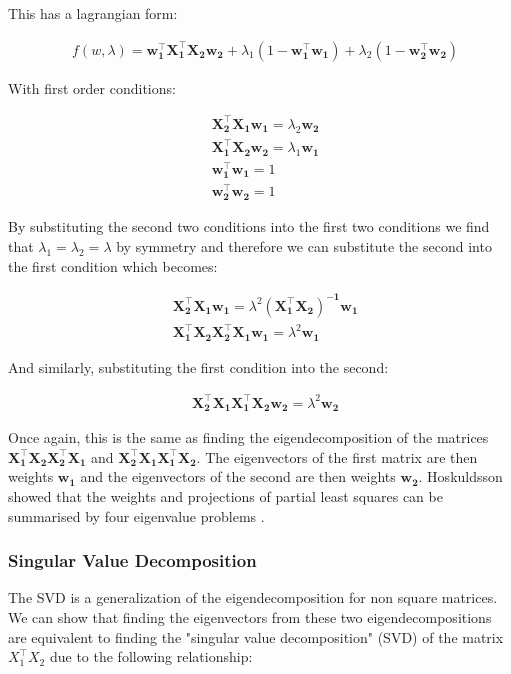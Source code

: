 This has a lagrangian form:

\begin{align}
     & f(w,\lambda)=\mathbf{w_1^{\top}X_1^{\top}X_2w_2} + \lambda_1(1-\mathbf{w_1^{\top}w_1}) + \lambda_2(1-\mathbf{w_2^{\top}w_2})
\end{align}

With first order conditions:

\begin{align}
     & \mathbf{X_2^{\top}X_1w_1}=\lambda_2\mathbf{w_2} \\
     & \mathbf{X_1^{\top}X_2w_2}=\lambda_1\mathbf{w_1} \\
     & \mathbf{w_1^{\top}w_1}=1                        \\
     & \mathbf{w_2^{\top}w_2}=1
\end{align}

By substituting the second two conditions into the first two conditions we find that $\lambda_1=\lambda_2=\lambda$ by symmetry and therefore we can substitute the second into the first condition which becomes:

\begin{align}
     & \mathbf{X_2^{\top}X_1w_1}=\lambda^2\mathbf{(X_1^{\top}X_2)^{-1}w_1} \\
     & \mathbf{X_1^{\top}X_2X_2^{\top}X_1w_1}=\lambda^2\mathbf{w_1}
\end{align}

And similarly, substituting the first condition into the second:

\begin{align}
     & \mathbf{X_2^{\top}X_1X_1^{\top}X_2w_2}=\lambda^2\mathbf{w_2}
\end{align}

Once again, this is the same as finding the eigendecomposition of the matrices $\mathbf{X_1^{\top}X_2X_2^{\top}X_1}$ and $\mathbf{X_2^{\top}X_1X_1^{\top}X_2}$. The eigenvectors of the first matrix are then weights $\mathbf{w_1}$ and the eigenvectors of the second are then weights $\mathbf{w_2}$. Hoskuldsson showed that the weights and projections of partial least squares can be summarised by four eigenvalue problems \cite{hoskuldsson1988pls}.

\subsubsection{Singular Value Decomposition}

The SVD is a generalization of the eigendecomposition for non square matrices. We can show that finding the eigenvectors from these two eigendecompositions are equivalent to finding the "singular value decomposition" (SVD) of the matrix $X_1^{\top}X_2$ due to the following relationship:

